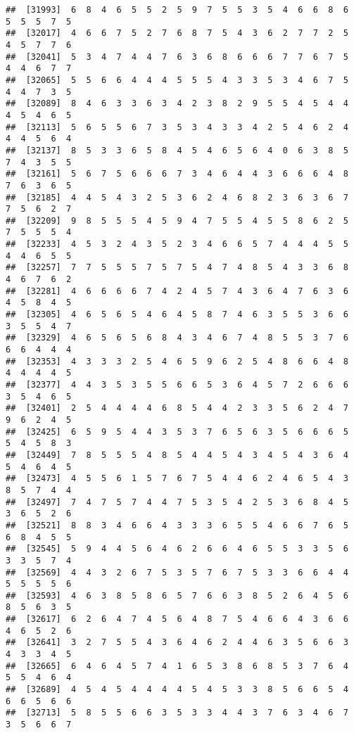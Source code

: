 \documentclass[
]{book}
\begin{document}
\begin{verbatim}
##  [31993]  6  8  4  6  5  5  2  5  9  7  5  5  3  5  4  6  6  8  6  5  5  5  7  5
##  [32017]  4  6  6  7  5  2  7  6  8  7  5  4  3  6  2  7  7  2  5  4  5  7  7  6
##  [32041]  5  3  4  7  4  4  7  6  3  6  8  6  6  6  7  7  6  7  5  4  4  6  7  7
##  [32065]  5  5  6  6  4  4  4  5  5  5  4  3  3  5  3  4  6  7  5  4  4  7  3  5
##  [32089]  8  4  6  3  3  6  3  4  2  3  8  2  9  5  5  4  5  4  4  4  5  4  6  5
##  [32113]  5  6  5  5  6  7  3  5  3  4  3  3  4  2  5  4  6  2  4  4  4  5  6  4
##  [32137]  8  5  3  3  6  5  8  4  5  4  6  5  6  4  0  6  3  8  5  7  4  3  5  5
##  [32161]  5  6  7  5  6  6  6  7  3  4  6  4  4  3  6  6  6  4  8  7  6  3  6  5
##  [32185]  4  4  5  4  3  2  5  3  6  2  4  6  8  2  3  6  3  6  7  7  5  6  2  7
##  [32209]  9  8  5  5  5  4  5  9  4  7  5  5  4  5  5  8  6  2  5  7  5  5  5  4
##  [32233]  4  5  3  2  4  3  5  2  3  4  6  6  5  7  4  4  4  5  5  4  4  6  5  5
##  [32257]  7  7  5  5  5  7  5  7  5  4  7  4  8  5  4  3  3  6  8  4  6  7  6  2
##  [32281]  4  6  6  6  6  7  4  2  4  5  7  4  3  6  4  7  6  3  6  4  5  8  4  5
##  [32305]  4  6  5  6  5  4  6  4  5  8  7  4  6  3  5  5  3  6  6  3  5  5  4  7
##  [32329]  4  6  5  6  5  6  8  4  3  4  6  7  4  8  5  5  3  7  6  6  6  4  4  4
##  [32353]  4  3  3  3  2  5  4  6  5  9  6  2  5  4  8  6  6  4  8  4  4  4  4  5
##  [32377]  4  4  3  5  3  5  5  6  6  5  3  6  4  5  7  2  6  6  6  3  5  4  6  5
##  [32401]  2  5  4  4  4  4  6  8  5  4  4  2  3  3  5  6  2  4  7  9  6  2  4  5
##  [32425]  6  5  9  5  4  4  3  5  3  7  6  5  6  3  5  6  6  6  5  5  4  5  8  3
##  [32449]  7  8  5  5  5  4  8  5  4  4  5  4  3  4  5  4  3  6  4  5  4  6  4  5
##  [32473]  4  5  5  6  1  5  7  6  7  5  4  4  6  2  4  6  5  4  3  8  5  7  4  4
##  [32497]  7  4  7  5  7  4  4  7  5  3  5  4  2  5  3  6  8  4  5  3  6  5  2  6
##  [32521]  8  8  3  4  6  6  4  3  3  3  6  5  5  4  6  6  7  6  5  6  8  4  5  5
##  [32545]  5  9  4  4  5  6  4  6  2  6  6  4  6  5  5  3  3  5  6  3  3  5  7  4
##  [32569]  4  4  3  2  6  7  5  3  5  7  6  7  5  3  3  6  6  4  4  5  5  5  5  6
##  [32593]  4  6  3  8  5  8  6  5  7  6  6  3  8  5  2  6  4  5  6  8  5  6  3  5
##  [32617]  6  2  6  4  7  4  5  6  4  8  7  5  4  6  6  4  3  6  6  4  6  5  2  6
##  [32641]  3  2  7  5  5  4  3  6  4  6  2  4  4  6  3  5  6  6  3  4  3  3  4  5
##  [32665]  6  4  6  4  5  7  4  1  6  5  3  8  6  8  5  3  7  6  4  5  5  4  6  4
##  [32689]  4  5  4  5  4  4  4  4  5  4  5  3  3  8  5  6  6  5  4  6  6  5  6  6
##  [32713]  5  8  5  5  6  6  3  5  3  3  4  4  3  7  6  3  4  6  7  3  5  6  6  7

\end{verbatim}
\end{document}
